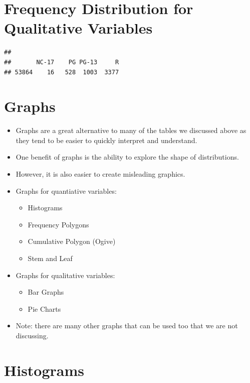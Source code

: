 \documentclass[12pt]{article}
\begin{document}
\section{Frequency Distribution for Qualitative
Variables}\label{frequency-distribution-for-qualitative-variables}

\begin{verbatim}
## 
##       NC-17    PG PG-13     R 
## 53864    16   528  1003  3377
\end{verbatim}

\section{Graphs}\label{graphs}

\begin{itemize}
\itemsep1pt\parskip0pt
\item
  Graphs are a great alternative to many of the tables we discussed
  above as they tend to be easier to quickly interpret and understand.
\item
  One benefit of graphs is the ability to explore the shape of
  distributions.
\item
  However, it is also easier to create misleading graphics.
\item
  Graphs for quantiative variables:

  \begin{itemize}
  \itemsep1pt\parskip0pt
  \item
    Histograms
  \item
    Frequency Polygons
  \item
    Cumulative Polygon (Ogive)
  \item
    Stem and Leaf
  \end{itemize}
\item
  Graphs for qualitative variables:

  \begin{itemize}
  \itemsep1pt\parskip0pt
  \item
    Bar Graphs
  \item
    Pie Charts
  \end{itemize}
\item
  Note: there are many other graphs that can be used too that we are not
  discussing.
\end{itemize}

\section{Histograms}\label{histograms}
\end{document}
